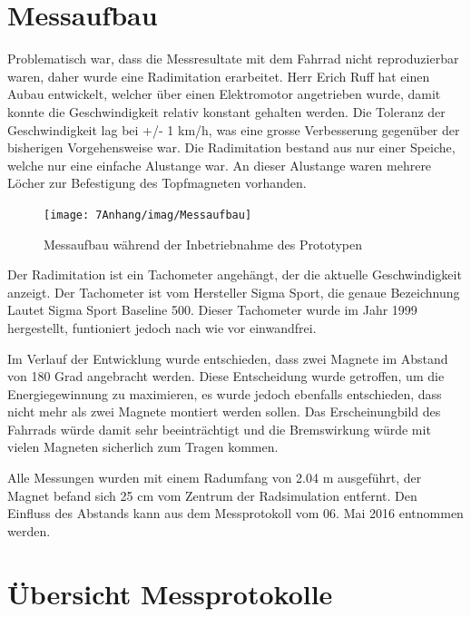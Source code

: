 \chapter{Messaufbau}
\label{messaufbau}
Problematisch war, dass die Messresultate mit dem Fahrrad nicht reproduzierbar waren, daher wurde eine Radimitation erarbeitet. Herr Erich Ruff hat einen Aubau entwickelt, welcher über einen Elektromotor angetrieben wurde, damit konnte die Geschwindigkeit relativ konstant gehalten werden. Die Toleranz der Geschwindigkeit lag bei +/- 1 km/h, was eine grosse Verbesserung gegenüber der bisherigen Vorgehensweise war.
Die Radimitation bestand aus nur einer Speiche, welche nur eine einfache Alustange war. An dieser Alustange waren mehrere Löcher zur Befestigung des Topfmagneten vorhanden.


\begin{figure}[ht]
    \texttt{[image: 7Anhang/imag/Messaufbau]}
	\caption{Messaufbau während der Inbetriebnahme des Prototypen}
	\label{messaufbau_anhang}
\end{figure}

Der Radimitation ist ein Tachometer angehängt, der die aktuelle Geschwindigkeit anzeigt. Der Tachometer ist vom Hersteller Sigma Sport, die genaue Bezeichnung Lautet Sigma Sport Baseline 500. Dieser Tachometer wurde im Jahr 1999 hergestellt, funtioniert jedoch nach wie vor einwandfrei.

Im Verlauf der Entwicklung wurde entschieden, dass zwei Magnete im Abstand von 180 Grad angebracht werden. Diese Entscheidung wurde getroffen, um die Energiegewinnung zu maximieren, es wurde jedoch ebenfalls entschieden, dass nicht mehr als zwei Magnete montiert werden sollen. Das Erscheinungbild des Fahrrads würde damit sehr beeinträchtigt und die Bremswirkung würde mit vielen Magneten sicherlich zum Tragen kommen.

Alle Messungen wurden mit einem Radumfang von 2.04 m ausgeführt, der Magnet befand sich 25 cm vom Zentrum der Radsimulation entfernt. Den Einfluss des Abstands kann aus dem Messprotokoll vom 06. Mai 2016 entnommen werden.

\chapter{Übersicht Messprotokolle}
\label{uebersicht_messprotokolle}

